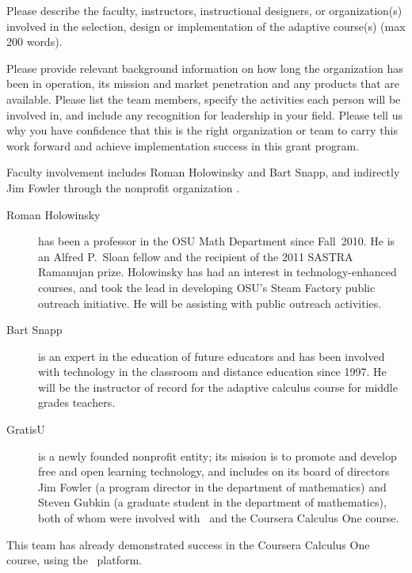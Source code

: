 \begin{question}
  Please describe the faculty, instructors, instructional designers,
  or organization(s) involved in the selection, design or
  implementation of the adaptive course(s) (max 200 words).

  Please provide relevant background information on how long the
  organization has been in operation, its mission and market
  penetration and any products that are available. Please list the
  team members, specify the activities each person will be involved
  in, and include any recognition for leadership in your field. Please
  tell us why you have confidence that this is the right organization
  or team to carry this work forward and achieve implementation
  success in this grant program.
\end{question}

Faculty involvement includes Roman Holowinsky and Bart Snapp, and
indirectly Jim Fowler through the nonprofit organization \gratisu.
\begin{description}
\item[Roman Holowinsky] has been a professor in the OSU Math
  Department since Fall~2010. He is an Alfred P.~Sloan fellow and the
  recipient of the 2011 SASTRA Ramanujan prize.  Holowinsky has had an
  interest in technology-enhanced courses, and took the lead in
  developing OSU's Steam Factory public outreach initiative.  He will
  be assisting with public outreach activities.
\item[Bart Snapp] is an expert in the education of future educators
  and has been involved with technology in the classroom and distance
  education since 1997.  He will be the instructor of record for the
  adaptive calculus course for middle grades teachers.
\item[GratisU] is a newly founded nonprofit entity; its mission is to
  promote and develop free and open learning technology, and includes
  on its board of directors Jim Fowler (a program director in the
  department of mathematics) and Steven Gubkin (a graduate student in
  the department of mathematics), both of whom were involved with
  \mooculus\ and the Coursera Calculus One course.
\end{description}
This team has already demonstrated success in the Coursera Calculus
One course, using the \mooculus\ platform.


